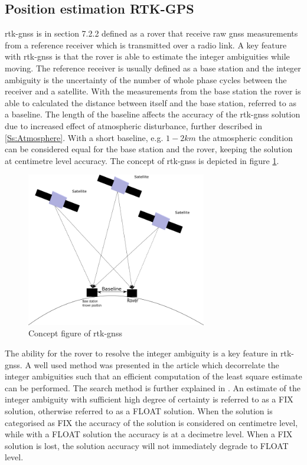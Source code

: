 \subsection{Position estimation RTK-GPS}\label{ss:rtk-gps}
\acrfull{rtk-gnss} is in \citep{misra2011global} section 7.2.2 defined as a rover that receive raw \gls{gnss} measurements from a reference receiver which is transmitted over a radio link. A key feature with \gls{rtk-gnss} is that the rover is able to estimate the integer ambiguities while moving. The reference receiver is usually defined as a base station and the integer ambiguity is the uncertainty of the number of whole phase cycles between the receiver and a satellite. With the measurements from the base station the rover is able to calculated the distance between itself and the base station, referred to as a baseline. The length of the baseline affects the accuracy of the \gls{rtk-gnss} solution due to increased effect of atmospheric disturbance, further described in \ref{Ss:Atmosphere}. With a short baseline, e.g. $1-2 km$ the atmospheric condition can be considered equal for the base station and the rover, keeping the solution at centimetre level accuracy. The concept of \gls{rtk-gnss} is depicted in figure \ref{figure:RTK}.
\begin{figure}[H]
	\centering
		\includegraphics[width=0.7\textwidth]{figs/DGPS.png}
		\caption{Concept figure of \acrfull{rtk-gnss}}
		\label{figure:RTK}
\end{figure}
The ability for the rover to resolve the integer ambiguity is a key feature in \gls{rtk-gnss}. A well used method was presented in the article \citep{teunissen1994new} which decorrelate the integer ambiguities such that an efficient computation of the least square estimate can be performed. The search method is further explained in \citep{teunissen1995least}. An estimate of the integer ambiguity with sufficient high degree of certainty is referred to as a FIX solution, otherwise referred to as a FLOAT solution. When the solution is categorised as FIX the accuracy of the solution is considered on centimetre level, while with a FLOAT solution the accuracy is at a decimetre level. When a FIX solution is lost, the solution accuracy will not immediately degrade to FLOAT level.

